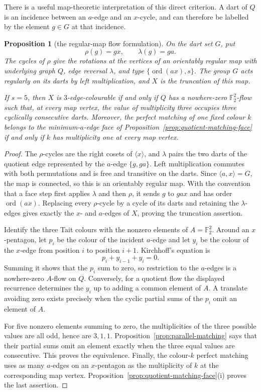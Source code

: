 \documentclass[11pt,a4paper]{article}
\newtheorem{proposition}[theorem]{Proposition}
\theoremstyle{definition}
\theoremstyle{remark}
\newcommand{\ord}{\operatorname{ord}}
\begin{document}
There is a useful map-theoretic interpretation of this direct criterion.  A dart of $Q$ is an incidence between an $a$-edge and an $x$-cycle, and can therefore be labelled by the element $g\in G$ at that incidence.
\begin{proposition}[the regular-map flow formulation]\label{prop:regular-map-flow}
On the dart set $G$, put
\[
 \rho(g)=gx,\qquad \lambda(g)=ga.
\]
The cycles of $\rho$ give the rotations at the vertices of an orientably regular map with underlying graph $Q$, edge reversal $\lambda$, and type $\{\ord(ax),s\}$.  The group $G$ acts regularly on its darts by left multiplication, and $X$ is the truncation of this map.

If $s=5$, then $X$ is $3$-edge-colourable if and only if $Q$ has a nowhere-zero $\mathbb F_2^2$-flow such that, at every map vertex, the value of multiplicity three occupies three cyclically consecutive darts.  Moreover, the perfect matching of one fixed colour $k$ belongs to the minimum-$a$-edge face of Proposition~\ref{prop:quotient-matching-face} if and only if $k$ has multiplicity one at every map vertex.
\end{proposition}
\begin{proof}
The $\rho$-cycles are the right cosets of $\langle x\rangle$, and $\lambda$ pairs the two darts of the quotient edge represented by the $a$-edge $\{g,ga\}$.  Left multiplication commutes with both permutations and is free and transitive on the darts.  Since $\langle a,x\rangle=G$, the map is connected, so this is an orientably regular map.  With the convention that a face step first applies $\lambda$ and then $\rho$, it sends $g$ to $gax$ and has order $\ord(ax)$.  Replacing every $\rho$-cycle by a cycle of its darts and retaining the $\lambda$-edges gives exactly the $x$- and $a$-edges of $X$, proving the truncation assertion.

Identify the three Tait colours with the nonzero elements of $A=\mathbb F_2^2$.  Around an $x$-pentagon, let $p_i$ be the colour of the incident $a$-edge and let $y_i$ be the colour of the $x$-edge from position $i$ to position $i+1$.  Kirchhoff's equation is
\[
 p_i+y_{i-1}+y_i=0.
\]
Summing it shows that the $p_i$ sum to zero, so restriction to the $a$-edges is a nowhere-zero $A$-flow on $Q$.  Conversely, for a quotient flow the displayed recurrence determines the $y_i$ up to adding a common element of $A$.  A translate avoiding zero exists precisely when the cyclic partial sums of the $p_i$ omit an element of $A$.

For five nonzero elements summing to zero, the multiplicities of the three possible values are all odd, hence are $3,1,1$.  Proposition~\ref{prop:parallel-matching} says that their partial sums omit an element exactly when the three equal values are consecutive.  This proves the equivalence.  Finally, the colour-$k$ perfect matching uses as many $a$-edges on an $x$-pentagon as the multiplicity of $k$ at the corresponding map vertex.  Proposition~\ref{prop:quotient-matching-face}\textup{(i)} proves the last assertion.
\end{proof}
\end{document}
